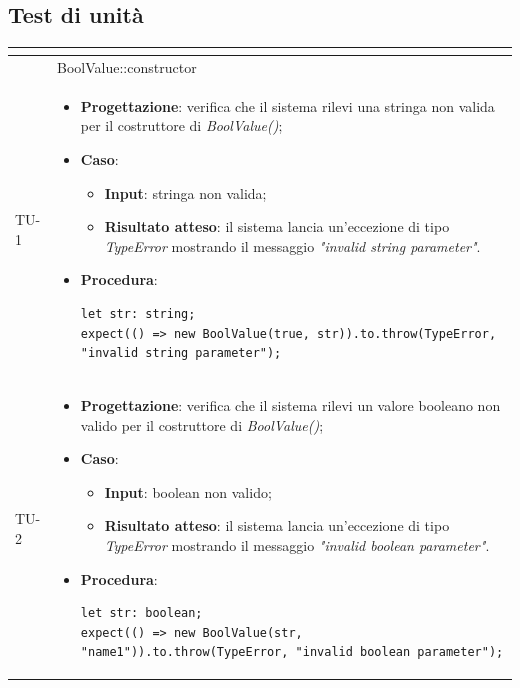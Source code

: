 \subsection{Test di unità}
\normalsize
\renewcommand{\arraystretch}{1}
\begin{longtable}{|C{1.5cm}|C{14.5cm}|}
	\hline
	\textbf{\color{title_text}{Test}} & \textbf{\color{title_text}{Specifica}}  \\
	\hline
	\endhead
	 & BoolValue::constructor\\
	\hline
	{TU-1} & 
	\begin{itemize}
		\item \textbf{Progettazione}: verifica che il sistema rilevi una stringa non valida per il costruttore di \emph{BoolValue()};
		\item \textbf{Caso}: 
		\begin{itemize}
			\item \textbf{Input}: stringa non valida;
			\item \textbf{Risultato atteso}: il sistema lancia un'eccezione di tipo \emph{TypeError} mostrando il messaggio \emph{"invalid string parameter"}.
		\end{itemize}
		\item \textbf{Procedura}:
		\begin{lstlisting}
let str: string;
expect(() => new BoolValue(true, str)).to.throw(TypeError, "invalid string parameter");
		\end{lstlisting}
	\end{itemize} \\
	\hline
	{TU-2} & 
	\begin{itemize}
		\item \textbf{Progettazione}: verifica che il sistema rilevi un valore booleano non valido per il costruttore di \emph{BoolValue()};
		\item \textbf{Caso}: 
		\begin{itemize}
			\item \textbf{Input}: boolean non valido;
			\item \textbf{Risultato atteso}: il sistema lancia un'eccezione di tipo \emph{TypeError} mostrando il messaggio \emph{"invalid boolean parameter"}.
		\end{itemize}
		\item \textbf{Procedura}:
		\begin{lstlisting}
let str: boolean;
expect(() => new BoolValue(str, "name1")).to.throw(TypeError, "invalid boolean parameter");

\end{lstlisting}
\end{itemize}
\end{longtable}
